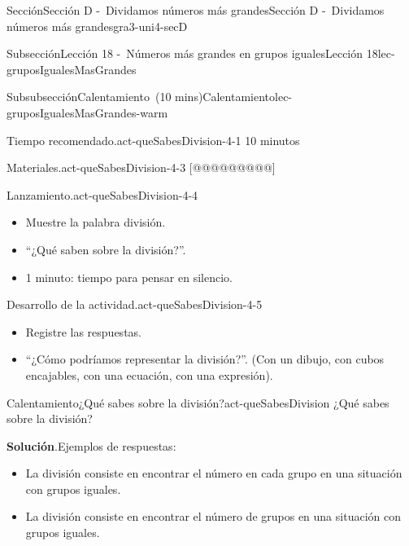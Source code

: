 \documentclass[oneside,10pt,]{article}
\newcommand{\blocktitlefont}{\relax}
\newlength{\fillinmaxwidth}
\newlength{\fillincontract}
\newlength{\charmaxwidth}\setlength{\charmaxwidth}{0.5em}
\newlength{\charminwidth}\setlength{\charminwidth}{0.1em}
\newlength{\fillinheight}
\newcommand{\fillintext}[1]{%
\setlength{\fillinmaxwidth}{#1\charmaxwidth}%
\setlength{\fillincontract}{#1\charminwidth}%
\setlength{\fillinheight}{\baselineskip}\addtolength{\fillinheight}{1.2pt}%
\strut\nobreak\leaders\vbox{\hrule width 0.3pt height 0.3pt \vskip -1.2pt}\hskip 1\fillinmaxwidth minus \fillincontract\nobreak\strut%
}
\begin{document}
\begin{sectionptx}{Sección}{Sección D -~Dividamos números más grandes}{}{Sección D -~Dividamos números más grandes}{}{}{gra3-uni4-secD}
\begin{subsectionptx}{Subsección}{Lección 18 -~Números más grandes en grupos iguales}{}{Lección 18}{}{}{lec-gruposIgualesMasGrandes}
%
\begin{subsubsectionptx}{Subsubsección}{Calentamiento~(10 mins)}{}{Calentamiento}{}{}{lec-gruposIgualesMasGrandes-warm}
\par
\begin{paragraphs}{Tiempo recomendado.}{act-queSabesDivision-4-1}%
10 minutos%
\end{paragraphs}%
%
\begin{paragraphs}{Materiales.}{act-queSabesDivision-4-3}%
[@@@@@@@@@]%
\end{paragraphs}%
\begin{paragraphs}{Lanzamiento.}{act-queSabesDivision-4-4}%
%
\begin{itemize}[label=\textbullet]
\item{}Muestre la palabra división.%
\item{}``¿Qué saben sobre la división?''.%
\item{}1 minuto: tiempo para pensar en silencio.%
\end{itemize}
\end{paragraphs}%
\begin{paragraphs}{Desarrollo de la actividad.}{act-queSabesDivision-4-5}%
%
\begin{itemize}[label=\textbullet]
\item{}Registre las respuestas.%
\item{}``¿Cómo podríamos representar la división?''. (Con un dibujo, con cubos encajables, con una ecuación, con una expresión).%
\end{itemize}
\end{paragraphs}%
\begin{exploration}{Calentamiento}{¿Qué sabes sobre la división?}{act-queSabesDivision}%
¿Qué sabes sobre la división?%
\par\smallskip%
\noindent\textbf{\blocktitlefont Solución}.\hypertarget{act-queSabesDivision-3}{}\quad{}Ejemplos de respuestas:%
%
\begin{itemize}[label=\textbullet]
\item{}La división consiste en encontrar el número en cada grupo en una situación con grupos iguales.%
\item{}La división consiste en encontrar el número de grupos en una situación con grupos iguales.%

\end{itemize}
\end{exploration}
\end{subsubsectionptx}
\end{subsectionptx}
\end{sectionptx}
\end{document}
